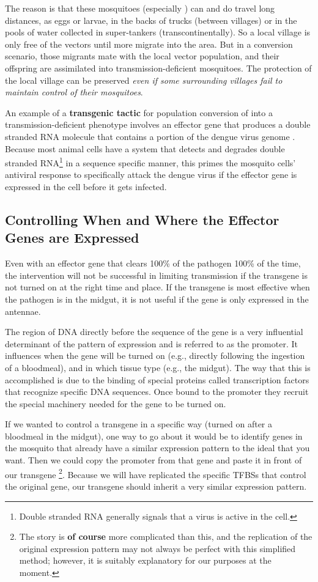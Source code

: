 The reason is that these mosquitoes (especially \Aa) can and do travel long distances, as eggs or larvae, in the backs of trucks (between villages) or in the pools of water collected in super-tankers (transcontinentally).
So a local village is only free of the vectors until more migrate into the area.
But in a conversion scenario, those migrants mate with the local vector population, and their offspring are assimilated into transmission-deficient mosquitoes.
The protection of the local village can be preserved \emph{even if some surrounding villages fail to maintain control of their mosquitoes}.

An example of a \textbf{transgenic tactic} for population conversion of \Aa into a transmission-deficient phenotype involves an effector gene that produces a double stranded RNA molecule that contains a portion of the dengue virus genome \cite{Franz2006,Mathur2010}.
Because most animal cells have a system that detects and degrades double stranded RNA\footnote{Double stranded RNA generally signals that a virus is active in the cell.}
in a sequence specific manner, this primes the mosquito cells' antiviral response to specifically attack the dengue virus if the effector gene is expressed in the cell before it gets infected.

\subsection{Controlling When and Where the Effector Genes are Expressed}

Even with an effector gene that clears 100\% of the pathogen 100\% of the time, the intervention will not be successful in limiting transmission if the transgene is not turned on at the right time and place.
If the transgene is most effective when the pathogen is in the midgut, it is not useful if the gene is only expressed in the antennae.

The region of DNA directly before the sequence of the gene is a very influential determinant of the pattern of expression and is referred to as the promoter.
It influences when the gene will be turned on (e.g., directly following the ingestion of a bloodmeal), and in which tissue type (e.g., the midgut).
The way that this is accomplished is due to the binding of special proteins called transcription factors that recognize specific DNA sequences.
Once bound to the promoter they recruit the special machinery needed for the gene to be turned on.

If we wanted to control a transgene in a specific way (turned on after a bloodmeal in the midgut), one way to go about it would be to identify genes in the mosquito that already have a similar expression pattern to the ideal that you want.
Then we could copy the promoter from that gene and paste it in front of our transgene
\footnote{The story is \textbf{of course} more complicated than this, and the replication of the
    original expression pattern may not always be perfect with this simplified method; however,
    it is suitably explanatory for our purposes at the moment.}.
Because we will have replicated the specific \glspl{TFBS} that control the original gene, our transgene should inherit a very similar expression pattern.


